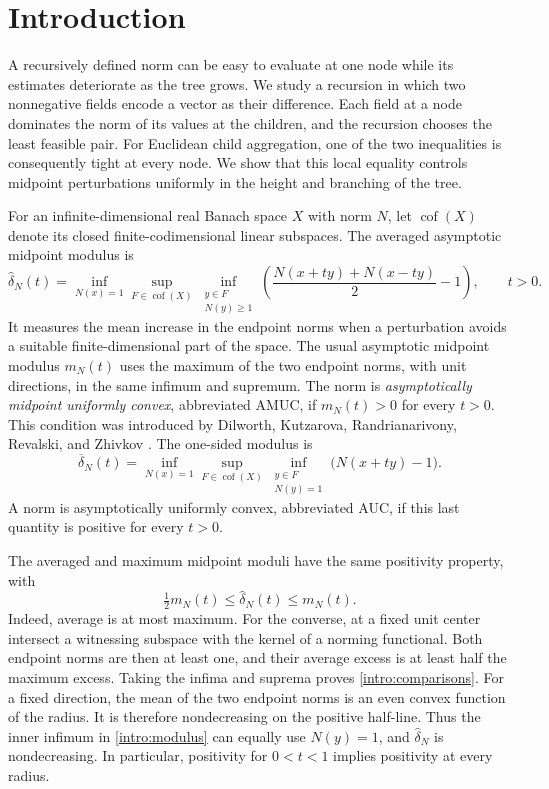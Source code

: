 \section{Introduction}\label{rec:intro}

A recursively defined norm can be easy to evaluate at one node while
its estimates deteriorate as the tree grows. We study a recursion in
which two nonnegative fields encode a vector as their difference.
Each field at a node dominates the norm of its values at the children,
and the recursion chooses the least feasible pair. For Euclidean child
aggregation, one of the two inequalities is consequently tight at
every node. We show that this local equality controls midpoint
perturbations uniformly in the height and branching of the tree.

For an infinite-dimensional real Banach space $X$ with norm $N$, let
$\operatorname{cof}(X)$ denote its closed finite-codimensional linear
subspaces. The averaged asymptotic midpoint modulus is
\begin{equation}\label{intro:modulus}
 \widehat\delta_N(t)=\inf_{N(x)=1}\sup_{F\in\operatorname{cof}(X)}
 \inf_{\substack{y\in F\\N(y)\ge1}}
 \left(\frac{N(x+ty)+N(x-ty)}2-1\right),\qquad t>0.
\end{equation}
It measures the mean increase in the endpoint norms when a perturbation
avoids a suitable finite-dimensional part of the space. The usual
asymptotic midpoint modulus $m_N(t)$ uses the maximum of the two
endpoint norms, with unit directions, in the same infimum and supremum.
The norm is \emph{asymptotically midpoint uniformly convex}, abbreviated
AMUC, if $m_N(t)>0$ for every $t>0$. This condition was introduced by
Dilworth, Kutzarova, Randrianarivony, Revalski, and Zhivkov
\cite[Definition~2.2]{DKRRZ2016}.
The one-sided modulus is
\begin{equation}\label{intro:auc}
 \overline\delta_N(t)=\inf_{N(x)=1}\sup_{F\in\operatorname{cof}(X)}
 \inf_{\substack{y\in F\\N(y)=1}}\bigl(N(x+ty)-1\bigr).
\end{equation}
A norm is asymptotically uniformly convex, abbreviated AUC, if this
last quantity is positive for every $t>0$.

The averaged and maximum midpoint moduli have the same positivity
property, with
\begin{equation}\label{intro:comparisons}
 \tfrac12m_N(t)\le\widehat\delta_N(t)\le m_N(t).
\end{equation}
Indeed, average is at most maximum. For the converse, at a fixed unit
center intersect a witnessing subspace with the kernel of a norming
functional. Both endpoint norms are then at least one, and their
average excess is at least half the maximum excess. Taking the
infima and suprema proves \eqref{intro:comparisons}.
For a fixed direction, the mean of the two endpoint norms is an even
convex function of the radius. It is therefore nondecreasing on the
positive half-line. Thus the inner infimum in \eqref{intro:modulus}
can equally use $N(y)=1$, and $\widehat\delta_N$ is nondecreasing.
In particular, positivity for $0<t<1$ implies positivity at every radius.

